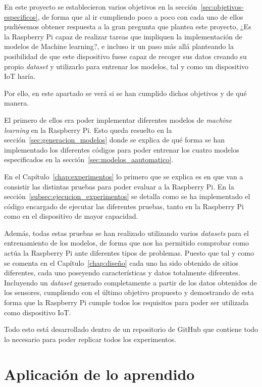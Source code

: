 \documentclass[a4paper, 12pt]{book}
\begin{document}
En este proyecto se establecieron varios objetivos en la sección~\ref{sec:objetivos-especificos}, de forma que al ir cumpliendo poco a poco con cada uno de ellos pudiésemos obtener respuesta a la gran pregunta que plantea este proyecto, ¿Es la Raspberry Pi capaz de realizar tareas que impliquen la implementación de modelos de Machine learning?, e incluso ir un paso más allá planteando la posibilidad de que este dispositivo fuese capaz de recoger sus datos creando su propio \textit{dataset} y utilizarlo para entrenar los modelos, tal y como un dispositivo IoT haría.

Por ello, en este apartado se verá si se han cumplido dichos objetivos y de qué manera.

El primero de ellos era poder implementar diferentes modelos de \textit{machine learning} en la Raspberry Pi. Esto queda resuelto en la sección~\ref{sec:generacion_modelos} donde se explica de qué forma se han implementado los diferentes códigos para poder entrenar los cuatro modelos especificados en la sección~\ref{sec:modelos_aautomatico}.

En el Capítulo~\ref{chap:experimentos} lo primero que se explica es en que van a consistir las distintas pruebas para poder evaluar a la Raspberry Pi. En la sección~\ref{subsec:ejecucion_experimentos} se detalla como se ha implementado el código encargado de ejecutar las diferentes pruebas, tanto en la Raspberry Pi como en el dispositivo de mayor capacidad.

Además, todas estas pruebas se han realizado utilizando varios \textit{datasets} para el entrenamiento de los modelos, de forma que nos ha permitido comprobar como actúa la Raspberry Pi ante diferentes tipos de problemas. Puesto que tal y como se comenta en el Capítulo~\ref{chap:diseño} cada uno ha sido obtenido de sitios diferentes, cada uno poseyendo características y datos totalmente diferentes. Incluyendo un \textit{dataset} generado completamente a partir de los datos obtenidos de los sensores, cumpliendo con el último objetivo propuesto y demostrando de esta forma que la Raspberry Pi cumple todos los requisitos para poder ser utilizada como dispositivo IoT.

Todo esto está desarrollado dentro de un repositorio de GitHub que contiene todo lo necesario para poder replicar todos los experimentos.

\section{Aplicación de lo aprendido}
\label{sec:aplicacion}
\end{document}
